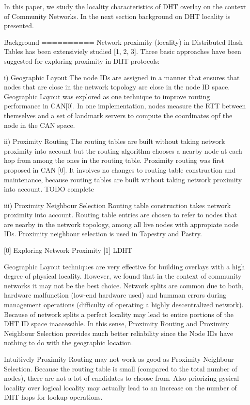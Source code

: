 In this paper, we study the locality characteristics of DHT overlay on the context of Community 
Networks. In the next section background on DHT locality is presented.


Background
==========
Network proximity (locality) in Distributed Hash Tables has been extensiviely studied [1, 2, 3]. 
Three basic approaches have been suggested for exploring proximity in DHT protocols:

i) Geographic Layout
The node IDs are assigned in a manner that ensures that nodes that are close in the 
network topology are close in the node ID space. Geographic Layout was explored as 
one technique to improve routing performance in CAN[0]. In one implementation, 
nodes measure the RTT between themselves and a set of landmark servers to compute 
the coordinates opf the node in the CAN space.

ii) Proximity Routing
The routing tables are built without taking network proximity into account but the 
routing algorithm chooses a nearby node at each hop from among the ones in the 
routing table. Proximity routing was first proposed in CAN [0]. It involves no 
changes to routing table construction and maintenance, because routing tables are 
built without taking network proximity into account. TODO complete

iii) Proximity Neighbour Selection
Routing table construction takes network proximity into account. Routing table 
entries are chosen to refer to nodes that are nearby in the network topology, 
among all live nodes with appropiate node IDs. Proximity neighbour selection is 
used in Tapestry and Pastry.

[0] Exploring Network Proximity
[1] LDHT

Geographic Layout techniques are very effective for building overlays with a 
high degree of physical locality. However, we found that in the context of 
community networks it may not be the best choice. Network splits are common due to both, 
hardware malfunction (low-end hardware used) and humman errors during management 
operations (difficulty of operating a highly descentralized network). Because of network 
splits a perfect locality may lead to entire portions of the DHT ID space inaccessible. 
In this sense, Proximity Routing and Proximity Neighbour Selection provides much better 
reliability since the Node IDs have nothing to do with the geographic location.

Intuitively Proximity Routing may not work as good as Proximity Neighbour Selection. 
Because the routing table is small (compared to the total number of nodes), there 
are not a lot of candidates to choose from. Also priorizing pysical locality over 
logical locality may actually lead to an increase on the number of DHT hops for 
lookup operations.

